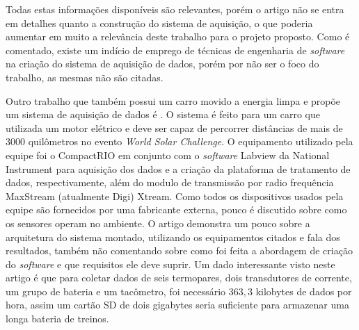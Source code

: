 Todas estas informações disponíveis são relevantes, porém o artigo não se entra em detalhes quanto a construção do sistema de aquisição, o que poderia aumentar em muito a relevância deste trabalho para o projeto proposto. Como é comentado, existe um indício de emprego de técnicas de engenharia de \textit{software} na criação do sistema de aquisição de dados, porém por não ser o foco do trabalho, as mesmas não são citadas. 

Outro trabalho que também possui um carro movido a energia limpa e propõe um sistema de aquisição de dados é . O sistema é feito para um carro que utilizada um motor elétrico e deve ser capaz de percorrer distâncias de mais de 3000 quilômetros no evento \textit{World Solar Challenge}. O equipamento utilizado pela equipe foi o CompactRIO em conjunto com o \textit{software} Labview da National Instrument para aquisição dos dados e a criação da plataforma de tratamento de dados, respectivamente, além do modulo de transmissão por radio frequência MaxStream (atualmente Digi) Xtream. Como todos os dispositivos usados pela equipe são fornecidos por uma fabricante externa, pouco é discutido sobre como os sensores operam no ambiente. O artigo demonstra um pouco sobre a arquitetura do sistema montado, utilizando os equipamentos citados e fala dos resultados, também não comentando sobre como foi feita a abordagem de criação do \textit{software} e que requisitos ele deve suprir. Um dado interessante visto neste artigo é que para coletar dados de seis termopares, dois transdutores de corrente, um grupo de bateria e um tacômetro, foi necessário $363,3$ kilobytes de dados por hora, assim um cartão SD de dois gigabytes seria suficiente para armazenar uma longa bateria de treinos. 


